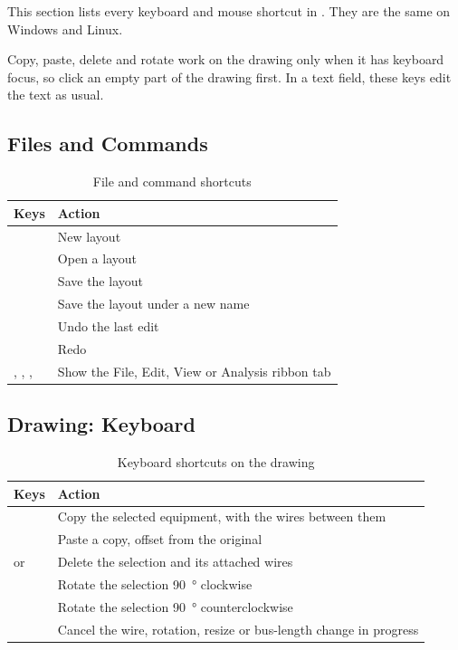 This section lists every keyboard and mouse shortcut in \app{}. They are the same on
Windows and Linux.

\begin{note}
Copy, paste, delete and rotate work on the drawing only when it has keyboard focus,
so click an empty part of the drawing first. In a text field, these keys edit the text
as usual.
\end{note}

\subsection{Files and Commands}

\begin{table}[H]
  \centering
  \caption{File and command shortcuts}
  \label{tab:keys-file}
  \begin{tabularx}{\textwidth}{l L}
    \toprule
    \textbf{Keys} & \textbf{Action} \\
    \midrule
     & New layout \\
     & Open a layout \\
     & Save the layout \\
     & Save the layout under a new name \\
     & Undo the last edit \\
     & Redo \\
    , , ,  & Show the File, Edit, View or Analysis ribbon tab \\
    \bottomrule
  \end{tabularx}
\end{table}

\subsection{Drawing: Keyboard}

\begin{table}[H]
  \centering
  \caption{Keyboard shortcuts on the drawing}
  \label{tab:keys-drawing}
  \begin{tabularx}{\textwidth}{l L}
    \toprule
    \textbf{Keys} & \textbf{Action} \\
    \midrule
     & Copy the selected equipment, with the wires between them \\
     & Paste a copy, offset from the original \\
     or  & Delete the selection and its attached wires \\
     & Rotate the selection \SI{90}{\degree} clockwise \\
     & Rotate the selection \SI{90}{\degree} counterclockwise \\
     & Cancel the wire, rotation, resize or bus-length change in progress \\
    \bottomrule
  \end{tabularx}
\end{table}

